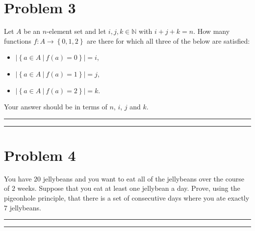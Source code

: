 \documentclass{article}
\theoremstyle{definition}
\newenvironment{solution}{\bigskip\hrule{\hfill}}{\bigskip\hrule{\hfill}} %
\begin{document}

\newpage


\section*{Problem 3}
Let $A$ be an $n$-element set and let $i,j,k\in\mathbb{N}$ with $i+j+k=n$. How many functions $f:A\longrightarrow\left\{0,1,2\right\}$ are there for which all three of the below are satisfied:
\begin{itemize}
    \item $\left|\left\{a\in A~\big\vert~f\left(a\right)=0\right\}\right|=i$,
    \item $\left|\left\{a\in A~\big\vert~f\left(a\right)=1\right\}\right|=j$,
    \item $\left|\left\{a\in A~\big\vert~f\left(a\right)=2\right\}\right|=k$.
\end{itemize}
Your answer should be in terms of $n$, $i$, $j$ and $k$.
\begin{solution}


\end{solution}


\newpage


\section*{Problem 4}
You have $20$ jellybeans and you want to eat all of the jellybeans over the course of $2$ weeks. Suppose that you eat at least one jellybean a day. Prove, using the pigeonhole principle, that there is a set of consecutive days where you ate exactly $7$ jellybeans.

\begin{solution}


\end{solution}
\end{document}
